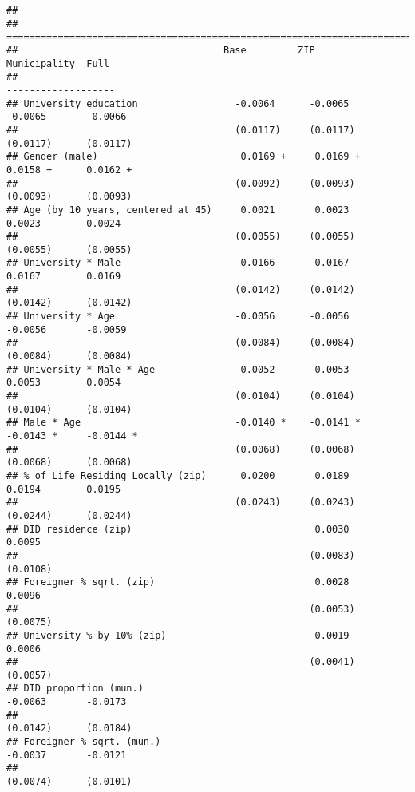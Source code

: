 \documentclass[
]{article}
\begin{document}
\begin{verbatim}
## 
## ======================================================================================
##                                    Base         ZIP          Municipality  Full       
## --------------------------------------------------------------------------------------
## University education                 -0.0064      -0.0065      -0.0065       -0.0066  
##                                      (0.0117)     (0.0117)     (0.0117)      (0.0117) 
## Gender (male)                         0.0169 +     0.0169 +     0.0158 +      0.0162 +
##                                      (0.0092)     (0.0093)     (0.0093)      (0.0093) 
## Age (by 10 years, centered at 45)     0.0021       0.0023       0.0023        0.0024  
##                                      (0.0055)     (0.0055)     (0.0055)      (0.0055) 
## University * Male                     0.0166       0.0167       0.0167        0.0169  
##                                      (0.0142)     (0.0142)     (0.0142)      (0.0142) 
## University * Age                     -0.0056      -0.0056      -0.0056       -0.0059  
##                                      (0.0084)     (0.0084)     (0.0084)      (0.0084) 
## University * Male * Age               0.0052       0.0053       0.0053        0.0054  
##                                      (0.0104)     (0.0104)     (0.0104)      (0.0104) 
## Male * Age                           -0.0140 *    -0.0141 *    -0.0143 *     -0.0144 *
##                                      (0.0068)     (0.0068)     (0.0068)      (0.0068) 
## % of Life Residing Locally (zip)      0.0200       0.0189       0.0194        0.0195  
##                                      (0.0243)     (0.0243)     (0.0244)      (0.0244) 
## DID residence (zip)                                0.0030                     0.0095  
##                                                   (0.0083)                   (0.0108) 
## Foreigner % sqrt. (zip)                            0.0028                     0.0096  
##                                                   (0.0053)                   (0.0075) 
## University % by 10% (zip)                         -0.0019                     0.0006  
##                                                   (0.0041)                   (0.0057) 
## DID proportion (mun.)                                          -0.0063       -0.0173  
##                                                                (0.0142)      (0.0184) 
## Foreigner % sqrt. (mun.)                                       -0.0037       -0.0121  
##                                                                (0.0074)      (0.0101) 

\end{verbatim}
\end{document}

